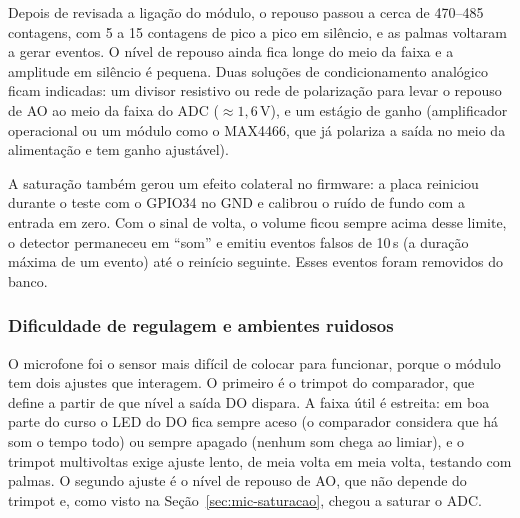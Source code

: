 Depois de revisada a ligação do módulo, o repouso passou a cerca de 470--485 contagens, com 5 a 15 contagens de pico a pico em silêncio, e as palmas voltaram a gerar eventos.  O nível de repouso ainda fica longe do meio da faixa e a amplitude em silêncio é pequena. Duas soluções de condicionamento analógico ficam indicadas: um divisor resistivo ou rede de polarização para levar o repouso de AO ao meio da faixa do ADC ($\approx 1{,}6$\,V), e um estágio de ganho (amplificador operacional ou um módulo como o MAX4466, que já polariza a saída no meio da alimentação e tem ganho ajustável).

A saturação também gerou um efeito colateral no firmware: a placa reiniciou durante o teste com o GPIO34 no GND e calibrou o ruído de fundo com a entrada em zero. Com o sinal de volta, o volume ficou sempre acima desse limite, o detector permaneceu em ``som'' e emitiu eventos falsos de 10\,s (a duração máxima de um evento) até o reinício seguinte. Esses eventos foram removidos do banco.

\subsubsection{Dificuldade de regulagem e ambientes ruidosos}
\label{sec:mic-regulagem}

O microfone foi o sensor mais difícil de colocar para funcionar, porque o módulo tem dois ajustes que interagem. O primeiro é o trimpot do comparador, que define a partir de que nível a saída DO dispara. A faixa útil é estreita: em boa parte do curso o LED do DO fica sempre aceso (o comparador considera que há som o tempo todo) ou sempre apagado (nenhum som chega ao limiar), e o trimpot multivoltas exige ajuste lento, de meia volta em meia volta, testando com palmas. O segundo ajuste é o nível de repouso de AO, que não depende do trimpot e, como visto na Seção~\ref{sec:mic-saturacao}, chegou a saturar o ADC.

